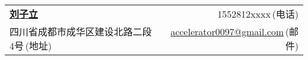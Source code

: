 \newcommand{\myheader}{
\begin{tabular*}{\textwidth}{l@{\extracolsep{\fill}}r}
  \textbf{\href{https://github.com/liuzili97}{\LARGE 刘子立}} & 1552812xxxx$\,${\color{labelgrey}(电话)} \\%
  四川省成都市成华区建设北路二段4号$\,${\color{labelgrey}(地址)} & 
  \href{mailto:accelerator0097@gmail.com}{accelerator0097@gmail.com}$\,${\color{labelgrey}(邮件)} \\
 
  \end{tabular*}\\\vspace{0.1in}}

\myheader